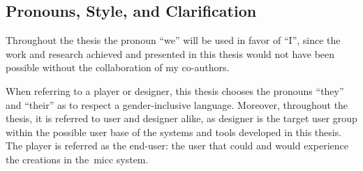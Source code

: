 

\subsection{Pronouns, Style, and Clarification}

Throughout the thesis the pronoun ``we'' will be used in favor of ``I'', since the work and research achieved and presented in this thesis would not have been possible without the collaboration of my co-authors. 

When referring to a player or designer, this thesis chooses the pronouns ``they'' and ``their'' as to respect a gender-inclusive language. Moreover, throughout the thesis, it is referred to user and designer alike, as designer is the target user group within the possible user base of the systems and tools developed in this thesis. The player is referred as the end-user: the user that could and would experience the creations in the~\acrlong{micc} system.

